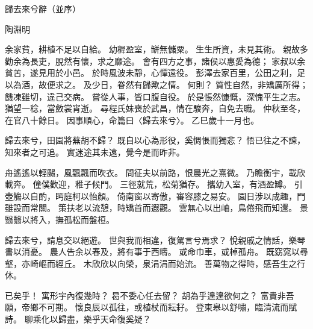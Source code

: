 歸去來兮辭（並序）

陶淵明

余家貧，耕植不足以自給。
幼穉盈室，缾無儲粟。
生生所資，未見其術。
親故多勸余為長吏，脫然有懷，求之靡途。
會有四方之事，諸侯以惠愛為德；
家叔以余貧苦，遂見用於小邑。
於時風波未靜，心憚遠役。
彭澤去家百里，公田之利，足以為酒，故便求之。
及少日，眷然有歸歟之情。
何則？
質性自然，非矯厲所得；
饑凍雖切，違己交病。
嘗從人事，皆口腹自役。
於是悵然慷慨，深愧平生之志。
猶望一稔，當斂裳宵逝。
尋程氏妹喪於武昌，情在駿奔，自免去職。
仲秋至冬，在官八十餘日。
因事順心，命篇曰〈歸去來兮〉。
乙巳歲十一月也。

歸去來兮，田園將蕪胡不歸？
既自以心為形役，奚惆悵而獨悲？
悟已往之不諫，知來者之可追。
實迷途其未遠，覺今是而昨非。

舟遙遙以輕颺，風飄飄而吹衣。
問征夫以前路，恨晨光之熹微。
乃瞻衡宇，載欣載奔。
僮僕歡迎，稚子候門。
三徑就荒，松菊猶存。
攜幼入室，有酒盈罇。
引壺觴以自酌，眄庭柯以怡顏。
倚南窗以寄傲，審容膝之易安。
園日涉以成趣，門雖設而常關。
策扶老以流憩，時矯首而遐觀。
雲無心以出岫，鳥倦飛而知還。
景翳翳以將入，撫孤松而盤桓。

歸去來兮，請息交以絕遊。
世與我而相違，復駕言兮焉求？
悅親戚之情話，樂琴書以消憂。
農人告余以春及，將有事于西疇。
或命巾車，或棹孤舟。
既窈窕以尋壑，亦崎嶇而經丘。
木欣欣以向榮，泉涓涓而始流。
善萬物之得時，感吾生之行休。

已矣乎！
寓形宇內復幾時？
曷不委心任去留？
胡為乎遑遑欲何之？
富貴非吾願，帝鄉不可期。
懷良辰以孤往，或植杖而耘耔。
登東皋以舒嘯，臨清流而賦詩。
聊乘化以歸盡，樂乎天命復奚疑？